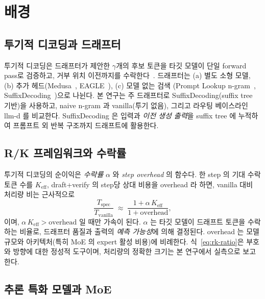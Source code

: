 
\section{배경}
\label{sec:background}

\subsection{투기적 디코딩과 드래프터}
\label{subsec:specdecode-bg}

투기적 디코딩은 드래프터가 제안한 $\gamma$개의 후보 토큰을
타깃 모델이 단일 forward pass로 검증하고,
거부 위치 이전까지를 수락한다~\cite{leviathan2023spec,chen2023spec}.
드래프터는 (a) 별도 소형 모델, (b) 추가 헤드(Medusa~\cite{cai2024medusa},
EAGLE~\cite{li2024eagle,li2025eagle3}), (c) 모델 없는 검색
(Prompt Lookup n-gram~\cite{saxena2024prompt},
SuffixDecoding~\cite{snowflake-arctic})으로 나뉜다.
본 연구는 주 드래프터로 SuffixDecoding(suffix tree 기반)을 사용하고,
naive n-gram 과 vanilla(투기 없음), 그리고 라우팅 베이스라인 llm-d 를 비교한다.
SuffixDecoding 은 입력과 \emph{이전 생성 출력}을 suffix tree 에 누적하여
프롬프트 외 반복 구조까지 드래프트에 활용한다.

\subsection{R/K 프레임워크와 수락률}
\label{subsec:rk-framework}

투기적 디코딩의 순이익은 \emph{수락률} $\alpha$ 와 \emph{step overhead} 의 함수다.
한 step 의 기대 수락 토큰 수를 $K_{\mathrm{eff}}$, draft+verify 의
step당 상대 비용을 overhead 라 하면, vanilla 대비 처리량 비는 근사적으로
\begin{equation}
\frac{T_{\mathrm{spec}}}{T_{\mathrm{vanilla}}}
  \;\approx\; \frac{1 + \alpha\,K_{\mathrm{eff}}}{1 + \mathrm{overhead}},
\label{eq:rk-ratio}
\end{equation}
이며, $\alpha\,K_{\mathrm{eff}} > \mathrm{overhead}$ 일 때만 가속이 된다.
$\alpha$ 는 타깃 모델이 드래프트 토큰을 수락하는 비율로,
드래프터 품질과 출력의 \emph{예측 가능성}에 의해 결정된다.
overhead 는 모델 규모와 아키텍처(특히 MoE 의 expert 활성 비용)에 비례한다.
식~\ref{eq:rk-ratio}은 부호와 방향에 대한 정성적 도구이며,
처리량의 정확한 크기는 본 연구에서 실측으로 보고한다.

\subsection{추론 특화 모델과 MoE}
\label{subsec:reasoning-moe-bg}

